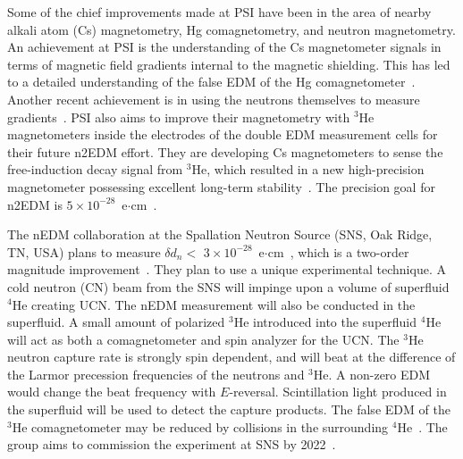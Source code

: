Some of the chief improvements made at PSI have been in the area of nearby alkali atom (Cs) magnetometry, Hg comagnetometry, and neutron magnetometry. An achievement at PSI is the understanding of the Cs magnetometer signals in terms of magnetic field gradients internal to the magnetic shielding. This has led to a detailed understanding of the false EDM of the Hg comagnetometer~\cite{psi_falseEDM}. Another recent achievement is in using the neutrons themselves to measure gradients~\cite{psi_n_gradient}. PSI also aims to improve their magnetometry with $^3\mathrm{He}$ magnetometers inside the electrodes of the double EDM measurement cells for their future n2EDM effort. They are developing Cs magnetometers to sense the free-induction decay signal from $^3\mathrm{He}$, which resulted in a new high-precision magnetometer possessing excellent long-term stability~\cite{psi_magnetometer}. The precision goal for n2EDM is $5 \times 10^{-28}$~e$\cdot$cm~\cite{psi_n2edm_nEDM-workshop,psi_n2edm_PPNS-workshop}.


The nEDM collaboration at the Spallation Neutron Source (SNS, Oak Ridge, TN, USA) plans to measure $\delta d_n<$ $3\times10^{-28}$~e$\cdot$cm~\cite{sns_nEDM-workshop}, which is a two-order magnitude improvement~\cite{sns_lim}. They plan to use a unique experimental technique. A cold neutron (CN) beam from the SNS will impinge upon a volume of superfluid $^4\mathrm{He}$ creating UCN. The nEDM measurement will also be conducted in the superfluid. A small amount of polarized $^3\mathrm{He}$ introduced into the superfluid $^4\mathrm{He}$ will act as both a comagnetometer and spin analyzer for the UCN. The $^3\mathrm{He}$ neutron capture rate is strongly spin dependent, and will beat at the difference of the Larmor precession frequencies of the neutrons and $^3\mathrm{He}$. A non-zero EDM would change the beat frequency with $E$-reversal. Scintillation light produced in the superfluid will be used to detect the capture products. The false EDM of the $^3\mathrm{He}$ comagnetometer may be reduced by collisions in the surrounding $^4\mathrm{He}$~\cite{sns_false_edm}. The group aims to commission the experiment at SNS by 2022~\cite{sns_nEDM-workshop}.


